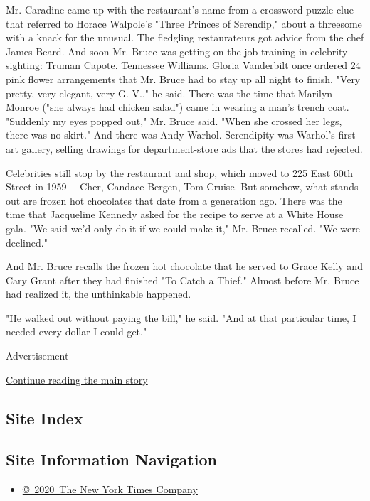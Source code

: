 Mr. Caradine came up with the restaurant's name from a crossword-puzzle
clue that referred to Horace Walpole's "Three Princes of Serendip,"
about a threesome with a knack for the unusual. The fledgling
restaurateurs got advice from the chef James Beard. And soon Mr. Bruce
was getting on-the-job training in celebrity sighting: Truman Capote.
Tennessee Williams. Gloria Vanderbilt once ordered 24 pink flower
arrangements that Mr. Bruce had to stay up all night to finish. "Very
pretty, very elegant, very G. V.," he said. There was the time that
Marilyn Monroe ("she always had chicken salad") came in wearing a man's
trench coat. "Suddenly my eyes popped out," Mr. Bruce said. "When she
crossed her legs, there was no skirt." And there was Andy Warhol.
Serendipity was Warhol's first art gallery, selling drawings for
department-store ads that the stores had rejected.

Celebrities still stop by the restaurant and shop, which moved to 225
East 60th Street in 1959 -\/- Cher, Candace Bergen, Tom Cruise. But
somehow, what stands out are frozen hot chocolates that date from a
generation ago. There was the time that Jacqueline Kennedy asked for the
recipe to serve at a White House gala. "We said we'd only do it if we
could make it," Mr. Bruce recalled. "We were declined."

And Mr. Bruce recalls the frozen hot chocolate that he served to Grace
Kelly and Cary Grant after they had finished "To Catch a Thief." Almost
before Mr. Bruce had realized it, the unthinkable happened.

"He walked out without paying the bill," he said. "And at that
particular time, I needed every dollar I could get."

Advertisement

\protect\hyperlink{after-bottom}{Continue reading the main story}

\hypertarget{site-index}{%
\subsection{Site Index}\label{site-index}}

\hypertarget{site-information-navigation}{%
\subsection{Site Information
Navigation}\label{site-information-navigation}}

\begin{itemize}
\tightlist
\item
  \href{https://help.nytimes.com/hc/en-us/articles/115014792127-Copyright-notice}{©~2020~The
  New York Times Company}
\end{itemize}

